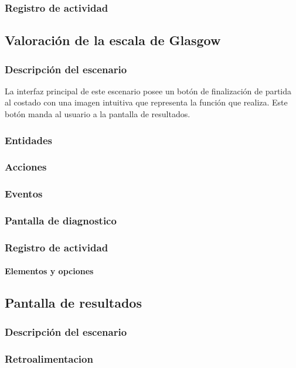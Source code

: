 \subsubsection{Registro de actividad}


\subsection{Valoración de la escala de Glasgow}

\subsubsection{Descripción del escenario}

La interfaz principal de este escenario posee un botón de finalización de
partida al costado con una imagen intuitiva que representa la función que
realiza. Este botón manda al usuario a la pantalla de resultados.

\subsubsection{Entidades}
\subsubsection{Acciones} 
\subsubsection{Eventos} 
\subsubsection{Pantalla de diagnostico}
\subsubsection{Registro de actividad}
\paragraph{Elementos y opciones}


\subsection{Pantalla de resultados}
\subsubsection{Descripción del escenario}
\subsubsection{Retroalimentacion}
